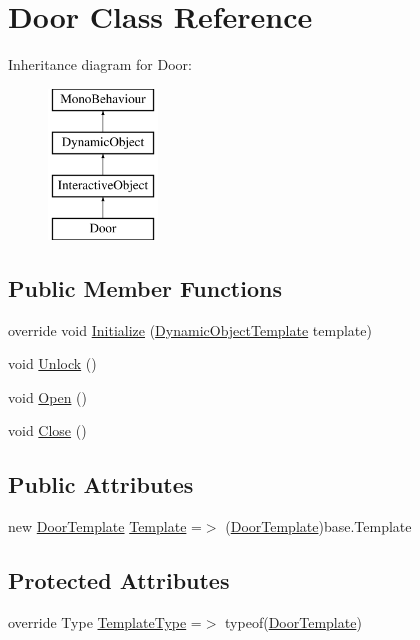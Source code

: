 \hypertarget{class_door}{}\section{Door Class Reference}
\label{class_door}
Inheritance diagram for Door\+:\begin{figure}[H]
\begin{center}
\leavevmode
\includegraphics[height=4.000000cm]{class_door}
\end{center}
\end{figure}
\subsection*{Public Member Functions}
\begin{DoxyCompactItemize}
\item 
override void \mbox{\hyperlink{class_door_acb583e1e2040bb093c035ec0fa03d273}{Initialize}} (\mbox{\hyperlink{class_dynamic_object_template}{Dynamic\+Object\+Template}} template)
\item 
void \mbox{\hyperlink{class_door_a11dace39b1b21cb04fc6508d6116f495}{Unlock}} ()
\item 
void \mbox{\hyperlink{class_door_a79629ef728511bbce03ebd1a3a133581}{Open}} ()
\item 
void \mbox{\hyperlink{class_door_a4ee490d221509a60073df05c186df9e6}{Close}} ()
\end{DoxyCompactItemize}
\subsection*{Public Attributes}
\begin{DoxyCompactItemize}
\item 
new \mbox{\hyperlink{class_door_template}{Door\+Template}} \mbox{\hyperlink{class_door_a20367672205558145cfdf995176503af}{Template}} =$>$ (\mbox{\hyperlink{class_door_template}{Door\+Template}})base.\+Template
\end{DoxyCompactItemize}
\subsection*{Protected Attributes}
\begin{DoxyCompactItemize}
\item 
override Type \mbox{\hyperlink{class_door_a279989c7a2f7605878ffb027b8687dea}{Template\+Type}} =$>$ typeof(\mbox{\hyperlink{class_door_template}{Door\+Template}})
\end{DoxyCompactItemize}
